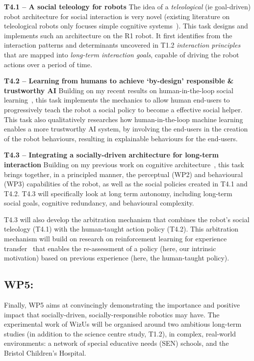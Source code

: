 \documentclass[11pt,a4paper]{report}
\newcommand{\project}{WizUs\xspace}
\begin{document}
\textbf{T4.1 -- A social teleology for robots}
The idea of a \emph{teleological} (ie goal-driven) robot architecture for social
interaction is very novel (existing literature on teleological robots only focuses
simple cognitive systems~\cite{oudeyer2005playground,forestier2017unified}). This task designs and implements such an
architecture on the R1 robot. It first identifies from the interaction patterns and
determinants uncovered in T1.2 \emph{interaction principles} that are mapped
into \emph{long-term interaction goals}, capable of driving the robot actions
over a period of time.

\textbf{T4.2 -- Learning from humans to achieve `by-design' responsible \&
trustworthy AI} Building on my recent results on human-in-the-loop
social learning~\cite{senft2017supervised,senft2019teaching,winkle2020couch}, this task
implements the mechanics to allow human end-users to progressively
teach the robot a social policy to become a effective social helper.
This task also qualitatively researches how human-in-the-loop machine learning enables a more
trustworthy AI system, by involving the end-users in the creation of the robot
behaviours, resulting in explainable behaviours for the end-users.

\textbf{T4.3 -- Integrating a socially-driven architecture for long-term
interaction} Building on my previous work on cognitive
architecture~\cite{lemaignan2017artificial}, this task brings together, in a
principled manner, the perceptual (WP2) and behavioural
(WP3) capabilities of the robot, as well as the social policies created in T4.1 and
T4.2. T4.3 will specifically look at long term autonomy, including long-term
social goals, cognitive redundancy, and behavioural complexity.

T4.3 will also develop the arbitration mechanism that combines the robot's
social teleology (T4.1) with the human-taught action policy (T4.2). This
arbitration mechanism will build on research on reinforcement learning for
experience transfer~\cite{madden2004transfer} that enables the re-assessment of
a policy (here, our intrinsic motivation) based on previous experience (here,
the human-taught policy).

\subsection{WP5: \textbf{\wpFive}}

Finally, WP5 aims at convincingly demonstrating the importance and positive impact that
socially-driven, socially-responsible robotics may have. The experimental work
of \project will be organised around two ambitious long-term studies (in
addition to the science centre study, T1.2), in complex, real-world environments: a
network of special educative needs (SEN) schools, and the Bristol Children's Hospital.
\end{document}
